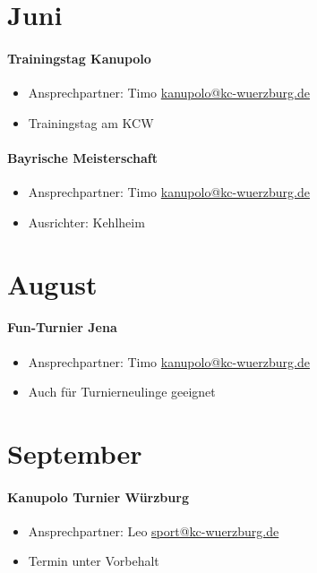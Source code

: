 \documentclass[12pt, a4paper]{report}
\begin{document}
\section*{Juni}\paragraph{Trainingstag Kanupolo}
\begin{itemize}
    \item Ansprechpartner: Timo \href{mailto:kanupolo@kc-wuerzburg.de}{kanupolo@kc-wuerzburg.de}
    \item Trainingstag am KCW
\end{itemize}

\paragraph{Bayrische Meisterschaft}
\begin{itemize}
    \item Ansprechpartner: Timo \href{mailto:kanupolo@kc-wuerzburg.de}{kanupolo@kc-wuerzburg.de}
    \item Ausrichter: Kehlheim
\end{itemize}

\section*{August}\paragraph{Fun-Turnier Jena}
\begin{itemize}
    \item Ansprechpartner: Timo \href{mailto:kanupolo@kc-wuerzburg.de}{kanupolo@kc-wuerzburg.de}
    \item Auch für Turnierneulinge geeignet
\end{itemize}

\section*{September}\paragraph{Kanupolo Turnier Würzburg}
\begin{itemize}
    \item Ansprechpartner: Leo \href{mailto:sport@kc-wuerzburg.de}{sport@kc-wuerzburg.de}
    \item Termin unter Vorbehalt
\end{itemize}
\end{document}
